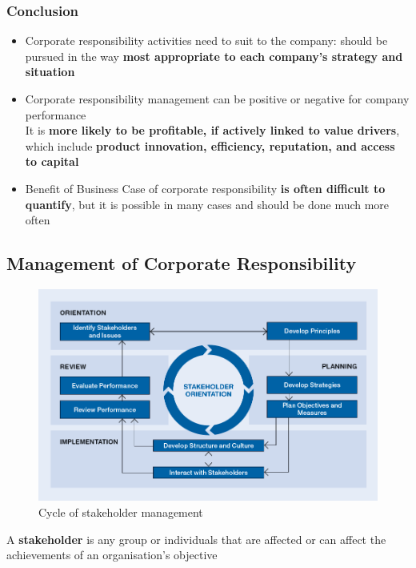 \documentclass[11pt]{article}
\theoremstyle{definition}
\begin{document}
\subsubsection{Conclusion}
\begin{itemize}[label=-]
	\item Corporate responsibility activities need to suit to the company: should be pursued in the way \textbf{most appropriate to each company's strategy and situation}
	\item Corporate responsibility management can be positive or negative for company performance\\It is \textbf{more likely to be profitable, if actively linked to value drivers}, which include \textbf{product innovation, efficiency, reputation, and access to capital}
	\item Benefit of Business Case of corporate responsibility \textbf{is often difficult to quantify}, but it is possible in many cases and should be done much more often
\end{itemize}

\subsection{Management of Corporate Responsibility}
\begin{figure}[H]
	\centering
	\includegraphics[width=0.8\linewidth]{img/stakeholder_management}
	\caption{Cycle of stakeholder management}
	\label{fig:stakeholdermanagement}
\end{figure}

\begin{definition}
	A \textbf{stakeholder} is any group or individuals that are affected or can affect the achievements of an
	organisation's objective
\end{definition}
\end{document}
